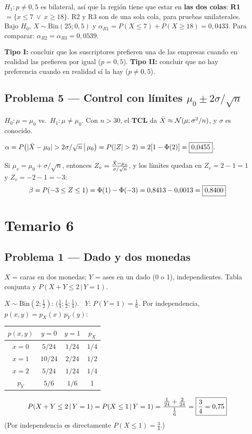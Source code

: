$H_1:p\neq0{,}5$ es bilateral, así que la región tiene que estar en \textbf{las dos colas}: \textbf{R1} $=\{x\le7\ \vee\ x\ge18\}$. R2 y R3 son de una sola cola, para pruebas unilaterales.
Bajo $H_0$, $X\sim\mathrm{Bin}(25;0{,}5)$ y $\alpha_{R1}=P(X\le7)+P(X\ge18)=0{,}0433$. Para comparar: $\alpha_{R2}=\alpha_{R3}=0{,}0539$.

\textbf{Tipo I:} concluir que los suscriptores prefieren una de las empresas cuando en realidad las prefieren por igual ($p=0{,}5$). \textbf{Tipo II:} concluir que no hay preferencia cuando en realidad sí la hay ($p\neq0{,}5$).

\subsection{Problema 5 --- Control con límites $\mu_0\pm2\sigma/\sqrt n$}
 $H_0:\mu=\mu_0$ vs.\ $H_1:\mu\neq\mu_0$. Con $n>30$, el \textbf{TCL} da $\bar{X}\approx\mathcal{N}(\mu;\sigma^2/n)$, y $\sigma$ es conocido.

 $\alpha=P\big(|\Xb-\mu_0|>2\sigma/\sqrt n\,\big|\,\mu_0\big)=P(|Z|>2)=2[1-\Phi(2)]=\res{0{,}0455}$.

 Si $\mu_v=\mu_0+\sigma/\sqrt n$, entonces $Z_v=\frac{\bar{X}-\mu_v}{\sigma/\sqrt n}$, y los límites quedan en $Z_v=2-1=1$ y $Z_v=-2-1=-3$:
\[
\beta=P(-3\le Z\le1)=\Phi(1)-\Phi(-3)=0{,}8413-0{,}0013=\boxed{0{,}8400}
\]

\newpage
\section{Temario 6}

\subsection{Problema 1 --- Dado y dos monedas}
\begin{enun}
$X$ = caras en dos monedas; $Y$ = ases en un dado (0 o 1), independientes. Tabla conjunta y $P(X+Y\le2\,|\,Y=1)$.
\end{enun}
$X\sim\mathrm{Bin}(2;\frac12)$: $\big(\frac14;\frac12;\frac14\big)$. \ $Y$: $P(Y=1)=\frac16$. Por independencia, $p(x,y)=p_X(x)\,p_Y(y)$:
\begin{center}
\renewcommand{\arraystretch}{1.3}
\begin{tabular}{@{}c|cc|c@{}}
\toprule
$p(x,y)$ & $y=0$ & $y=1$ & $p_X$\\\midrule
$x=0$ & $5/24$ & $1/24$ & $1/4$\\
$x=1$ & $10/24$ & $2/24$ & $1/2$\\
$x=2$ & $5/24$ & $1/24$ & $1/4$\\\midrule
$p_Y$ & $5/6$ & $1/6$ & 1\\\bottomrule
\end{tabular}
\end{center}
\[
P(X+Y\le2\,|\,Y=1)=P(X\le1\,|\,Y=1)=\frac{\frac1{24}+\frac2{24}}{\frac16}=\boxed{\frac34=0{,}75}
\]
(Por independencia es directamente $P(X\le1)=\frac34$.)


